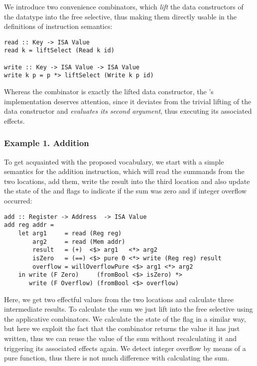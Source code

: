 We introduce two convenience combinators, which \emph{lift} the data constructors
of the  datatype into the free selective, thus making them directly usable in
the definitions of instruction semantics:

\begin{verbatim}
read :: Key -> ISA Value
read k = liftSelect (Read k id)

write :: Key -> ISA Value -> ISA Value
write k p = p *> liftSelect (Write k p id)
\end{verbatim}

Whereas the  combinator is exactly the lifted  data constructor, the 's implementation deserves attention, since it deviates from the trivial lifting of
the  data constructor and \emph{evaluates its second argument}, thus executing its
associated effects.

\subsubsection{\textbf{Example 1. Addition}}

To get acquainted with the proposed vocabulary, we start with a simple semantics for
the addition instruction, which will read the summands from the two locations, add them,
write the result into the third location and also update the state of the 
and  flags to indicate if the sum was zero and if integer overflow occurred:

\begin{verbatim}
add :: Register -> Address  -> ISA Value
add reg addr =
    let arg1     = read (Reg reg)
        arg2     = read (Mem addr)
        result   = (+)  <$> arg1   <*> arg2
        isZero   = (==) <$> pure 0 <*> write (Reg reg) result
        overflow = willOverflowPure <$> arg1 <*> arg2
    in write (F Zero)     (fromBool <$> isZero) *>
       write (F Overflow) (fromBool <$> overflow)
\end{verbatim}

Here, we get two effectful values from the two locations and calculate three intermediate
results. To calculate the sum we just lift \hs{+} into the free selective using the applicative
combinators. We calculate the state of the  flag in a similar way, but here we
exploit the fact that the  combinator returns the value it has just written, thus we
can reuse the value of the sum without recalculating it and triggering its associated effects
again. We detect integer overflow by means of a pure function, thus there is not much difference
with calculating the sum.

